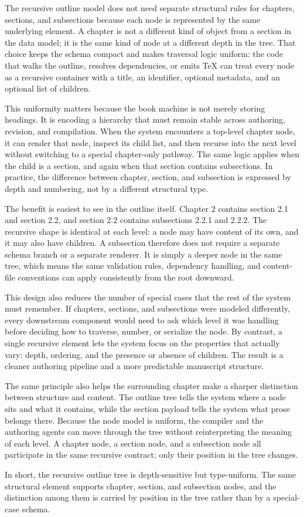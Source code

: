 The recursive outline model does not need separate structural rules for chapters, sections, and subsections because each node is represented by the same underlying element. A chapter is not a different kind of object from a section in the data model; it is the same kind of node at a different depth in the tree. That choice keeps the schema compact and makes traversal logic uniform: the code that walks the outline, resolves dependencies, or emits TeX can treat every node as a recursive container with a title, an identifier, optional metadata, and an optional list of children.

This uniformity matters because the book machine is not merely storing headings. It is encoding a hierarchy that must remain stable across authoring, revision, and compilation. When the system encounters a top-level chapter node, it can render that node, inspect its child list, and then recurse into the next level without switching to a special chapter-only pathway. The same logic applies when the child is a section, and again when that section contains subsections. In practice, the difference between chapter, section, and subsection is expressed by depth and numbering, not by a different structural type.

The benefit is easiest to see in the outline itself. Chapter 2 contains section 2.1 and section 2.2, and section 2.2 contains subsections 2.2.1 and 2.2.2. The recursive shape is identical at each level: a node may have content of its own, and it may also have children. A subsection therefore does not require a separate schema branch or a separate renderer. It is simply a deeper node in the same tree, which means the same validation rules, dependency handling, and content-file conventions can apply consistently from the root downward.

This design also reduces the number of special cases that the rest of the system must remember. If chapters, sections, and subsections were modeled differently, every downstream component would need to ask which level it was handling before deciding how to traverse, number, or serialize the node. By contrast, a single recursive element lets the system focus on the properties that actually vary: depth, ordering, and the presence or absence of children. The result is a cleaner authoring pipeline and a more predictable manuscript structure.

The same principle also helps the surrounding chapter make a sharper distinction between structure and content. The outline tree tells the system where a node sits and what it contains, while the section payload tells the system what prose belongs there. Because the node model is uniform, the compiler and the authoring agents can move through the tree without reinterpreting the meaning of each level. A chapter node, a section node, and a subsection node all participate in the same recursive contract; only their position in the tree changes.

In short, the recursive outline tree is depth-sensitive but type-uniform. The same structural element supports chapter, section, and subsection nodes, and the distinction among them is carried by position in the tree rather than by a special-case schema.
